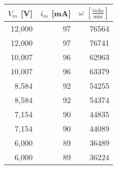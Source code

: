 \begin{tabular}{r|r|r}
$V_m$ [V]&$i_m$ [mA]&$\omega$ $\left[\frac{\text{ticks}}{\text{min}}\right]$\\\hline
12,000&97&76564\\
12,000&97&76741\\
10,007&96&62963\\
10,007&96&63379\\
8,584&92&54255\\
8,584&92&54374\\
7,154&90&44835\\
7,154&90&44089\\
6,000&89&36489\\
6,000&89&36224\\
\end{tabular}
